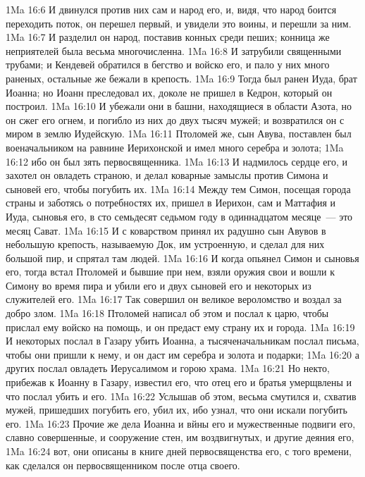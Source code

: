 \vs 1Ma 16:6 И двинулся против них сам и народ его, и, видя, что народ боится переходить поток, он перешел первый, и увидели это воины, и перешли за ним.
\vs 1Ma 16:7 И разделил он народ, поставив конных среди пеших; конница же неприятелей была весьма многочисленна.
\vs 1Ma 16:8 И затрубили священными трубами; и Кендевей обратился в бегство и войско его, и пало у них много раненых, остальные же бежали в крепость.
\vs 1Ma 16:9 Тогда был ранен Иуда, брат Иоанна; но Иоанн преследовал их, доколе не пришел в Кедрон, который он построил.
\vs 1Ma 16:10 И убежали они в башни, находящиеся в области Азота, но он сжег его огнем, и погибло из них до двух тысяч мужей; и возвратился он с миром в землю Иудейскую.
\rsbpar\vs 1Ma 16:11 Птоломей же, сын Авува, поставлен был военачальником на равнине Иерихонской и имел много серебра и золота;
\vs 1Ma 16:12 ибо он был зять первосвященника.
\vs 1Ma 16:13 И надмилось сердце его, и захотел он овладеть страною, и делал коварные замыслы против Симона и сыновей его, чтобы погубить их.
\vs 1Ma 16:14 Между тем Симон, посещая города страны и заботясь о потребностях их, пришел в Иерихон, сам и Маттафия и Иуда, сыновья его, в сто семьдесят седьмом году в одиннадцатом месяце~--- это месяц Сават.
\vs 1Ma 16:15 И с коварством принял их радушно сын Авувов в небольшую крепость, называемую Док, им устроенную, и сделал для них большой пир, и спрятал там людей.
\vs 1Ma 16:16 И когда опьянел Симон и сыновья его, тогда встал Птоломей и бывшие при нем, взяли оружия свои и вошли к Симону во время пира и убили его и двух сыновей его и некоторых из служителей его.
\vs 1Ma 16:17 Так совершил он великое вероломство и воздал за добро злом.
\vs 1Ma 16:18 Птоломей написал об этом и послал к царю, чтобы прислал ему войско на помощь, и он предаст ему страну их и города.
\vs 1Ma 16:19 И некоторых послал в Газару убить Иоанна, а тысяченачальникам послал письма, чтобы они пришли к нему, и он даст им серебра и золота и подарки;
\vs 1Ma 16:20 а других послал овладеть Иерусалимом и горою храма.
\vs 1Ma 16:21 Но некто, прибежав к Иоанну в Газару, известил его, что отец его и братья умерщвлены и что  послал убить и его.
\vs 1Ma 16:22 Услышав об этом,  весьма смутился и, схватив мужей, пришедших погубить его, убил их, ибо узнал, что они искали погубить его.
\rsbpar\vs 1Ma 16:23 Прочие же дела Иоанна и вйны его и мужественные подвиги его, славно совершенные, и сооружение стен, им воздвигнутых, и другие деяния его,
\vs 1Ma 16:24 вот, они описаны в книге дней первосвященства его, с того времени, как сделался он первосвященником после отца своего.
